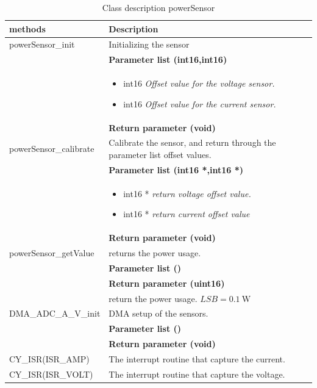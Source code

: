 \begin{table}[H]
	\centering
	\begin{tabular}{|p{5 cm}|p{10 cm}|}
		\hline
		\textbf{methods} & \textbf{Description} \\ \hline
		
		powerSensor\_init
		& Initializing the sensor
		\\ & \textbf{Parameter list (int16,int16)}
		\\ & \begin{itemize}
			\item {\large int16}
			\subitem \textit{Offset value for the voltage sensor.}
			\item {\large int16}
			\subitem \textit{Offset value for the current sensor.}
		\end{itemize}
		\\ & \textbf{Return parameter (void)}
		\\ \hline
		
		powerSensor\_calibrate
		& Calibrate the sensor, and return through the parameter list offset values.
		\\ & \textbf{Parameter list (int16 *,int16 *)}
		\\ & \begin{itemize}
			\item {\large int16 *}
			\subitem \textit{return voltage offset value.}
			\item {\large int16 *}
			\subitem \textit{return current offset value}
		\end{itemize}
		\\ & \textbf{Return parameter (void)}
		\\ \hline
		
		powerSensor\_getValue
		& returns the power usage.
		\\ & \textbf{Parameter list ()}
		\\ & \textbf{Return parameter (uint16)}
		\\ & return the power usage. $ LSB = \SI{0.1}{\watt} $
		\\ \hline
		
		DMA\_ADC\_A\_V\_init
		& DMA setup of the sensors.
		\\ & \textbf{Parameter list ()}
		\\ & \textbf{Return parameter (void)}
		\\ \hline
		
		CY\_ISR(ISR\_AMP)
		& The interrupt routine that capture the current.
		\\ \hline
		
		CY\_ISR(ISR\_VOLT)
		& The interrupt routine that capture the voltage.
		\\ \hline
		
	\end{tabular}
	\caption{Class description powerSensor}
	\label{table:Class_description_MCU_powerSensor}
\end{table}


